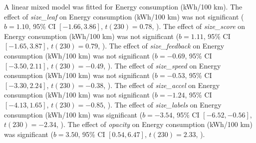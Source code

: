 A linear mixed model was fitted for Energy consumption (kWh/100 km).
The effect of \textit{size\_leaf} on Energy consumption (kWh/100 km) was not significant ($b = 1.10$, 95\% CI $[-1.66, 3.86]$, $t(230) = 0.78$, ).
The effect of \textit{size\_score} on Energy consumption (kWh/100 km) was not significant ($b = 1.11$, 95\% CI $[-1.65, 3.87]$, $t(230) = 0.79$, ).
The effect of \textit{size\_feedback} on Energy consumption (kWh/100 km) was not significant ($b = -0.69$, 95\% CI $[-3.50, 2.11]$, $t(230) = -0.49$, ).
The effect of \textit{size\_speed} on Energy consumption (kWh/100 km) was not significant ($b = -0.53$, 95\% CI $[-3.30, 2.24]$, $t(230) = -0.38$, ).
The effect of \textit{size\_accel} on Energy consumption (kWh/100 km) was not significant ($b = -1.24$, 95\% CI $[-4.13, 1.65]$, $t(230) = -0.85$, ).
The effect of \textit{size\_labels} on Energy consumption (kWh/100 km) was significant ($b = -3.54$, 95\% CI $[-6.52, -0.56]$, $t(230) = -2.34$, ).
The effect of \textit{opacity} on Energy consumption (kWh/100 km) was significant ($b = 3.50$, 95\% CI $[0.54, 6.47]$, $t(230) = 2.33$, ).
